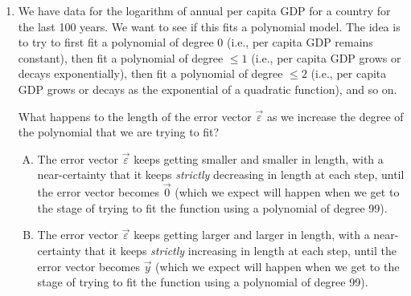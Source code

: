 \documentclass[10pt]{amsart}
\begin{document}
\begin{enumerate}
  \begin{enumerate}[(A)]
  \item We choose $\vec{\varepsilon}$ to have the minimum length
    possible subject to the constraint that $X\vec{\beta} = \vec{y} -
    \vec{\varepsilon}$ has a solution.
  \item We choose $\vec{\varepsilon}$ such that the system
    $X\vec{\beta} = \vec{y} - \vec{\varepsilon}$ can be solved and
    such that the solution vector $\vec{\beta}$ has the minimum
    possible length (among all such choices of $\vec{\varepsilon}$).
  \item We choose $\vec{\varepsilon}$ such that the system
    $X\vec{\beta} = \vec{y} - \vec{\varepsilon}$ can be solved and
    such that the difference vector $\vec{y} - \vec{\varepsilon}$ has
    the minimum possible length (among all such choices of
    $\vec{\varepsilon}$).
  \end{enumerate}

  {\em Answer}: Option (A)

  {\em Explanation}: We want to deviate as little as possible from the
  measured output. This is the idea behind using the orthogonal
  projection.
  
  {\em Performance review}: 18 out of 25 people got this. 6 chose (C),
  1 chose (B).

\item We have data for the logarithm of annual per capita GDP for a
  country for the last 100 years. We want to see if this fits a
  polynomial model. The idea is to try to first fit a polynomial of
  degree $0$ (i.e., per capita GDP remains constant), then fit a
  polynomial of degree $\le 1$ (i.e., per capita GDP grows or decays
  exponentially), then fit a polynomial of degree $\le 2$ (i.e., per
  capita GDP grows or decays as the exponential of a quadratic
  function), and so on.

  What happens to the length of the error vector $\vec{\varepsilon}$ as
  we increase the degree of the polynomial that we are trying to fit?

  \begin{enumerate}[(A)]
  \item The error vector $\vec{\varepsilon}$ keeps getting smaller and
    smaller in length, with a near-certainty that it keeps
    {\em strictly} decreasing in length at each step, until the error
    vector becomes $\vec{0}$ (which we expect will happen when we get
    to the stage of trying to fit the function using a polynomial of
    degree 99).
  \item The error vector $\vec{\varepsilon}$ keeps getting larger and
    larger in length, with a near-certainty that it keeps {\em
      strictly} increasing in length at each step, until the error
    vector becomes $\vec{y}$ (which we expect will happen when we get
    to the stage of trying to fit the function using a polynomial of
    degree 99).
  \end{enumerate}


\end{enumerate}
\end{document}
